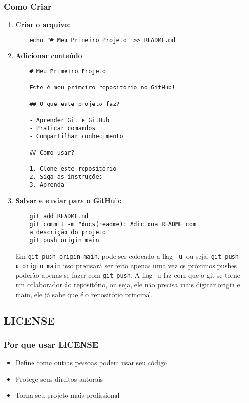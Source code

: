 \subsubsection{Como Criar}
\begin{enumerate}
    \item \textbf{Criar o arquivo:}
    \begin{verbatim}
    echo "# Meu Primeiro Projeto" >> README.md
    \end{verbatim}
    
    \item \textbf{Adicionar conteúdo:}
    \begin{verbatim}
    # Meu Primeiro Projeto
     
    Este é meu primeiro repositório no GitHub!
     
    ## O que este projeto faz?
     
    - Aprender Git e GitHub
    - Praticar comandos
    - Compartilhar conhecimento
     
    ## Como usar?
     
    1. Clone este repositório
    2. Siga as instruções
    3. Aprenda!
    \end{verbatim}
    
    \item \textbf{Salvar e enviar para o GitHub:}
    \begin{verbatim}
    git add README.md
    git commit -m "docs(readme): Adiciona README com 
    a descrição do projeto"
    git push origin main
    \end{verbatim}
    Em \texttt{git push origin main}, pode ser colocado a flag \texttt{-u}, ou seja, \texttt{git push -u origin main} isso precisará ser feito apenas uma vez os próximos pushes poderão apenas se fazer com \texttt{git push}.
    A flag -u faz com que o git se torne um colaborador do repositório, ou seja, ele não precisa mais digitar origin e main, ele já sabe que é o repositório principal.
\end{enumerate}

\subsection{LICENSE}

\subsubsection{Por que usar LICENSE}
\begin{itemize}
    \item Define como outras pessoas podem usar seu código
    \item Protege seus direitos autorais
    \item Torna seu projeto mais profissional
\end{itemize}

